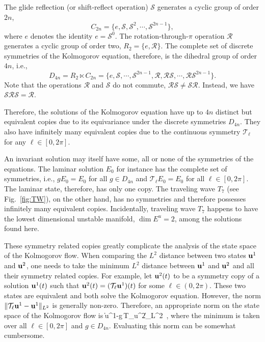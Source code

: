 \documentclass{jfm}
\begin{document}
The glide reflection (or shift-reflect operation) $\mathcal S$ generates a cyclic group of order $2n$,
$$C_{2n}=\{e,\mathcal S,\mathcal S^2,\cdots,\mathcal S^{2n-1}\},$$
where $e$ denotes the
identity $e=\mathcal S^0$.
The rotation-through-$\pi$ operation $\mathcal R$ generates
a cyclic group of order two, $R_2=\{e,\mathcal R\}$. The complete set of discrete symmetries
of the Kolmogorov equation, therefore, is the dihedral group of order $4n$, i.e.,
$$D_{4n}=R_2\ltimes C_{2n}=\{e,\mathcal S,\cdots, \mathcal S^{2n-1},
\mathcal R,\mathcal R\mathcal S,\cdots,\mathcal R\mathcal S^{2n-1} \}.$$
Note that the operations $\mathcal R$ and $\mathcal S$ do not commute,
$\mathcal R\mathcal S\neq \mathcal S\mathcal R$. Instead, we have
$\mathcal S\mathcal R\mathcal S=\mathcal R$.

Therefore, the solutions of the Kolmogorov equation have up to $4n$ distinct but
equivalent copies due to its equivariance under the discrete symmetries $D_{4n}$.
They also have infinitely many equivalent copies due to the continuous symmetry
$\mathcal T_\ell$ for any $\ell\in[0,2\pi]$.

An invariant solution may itself have some, all or none of the symmetries of the equations.
The laminar solution $E_0$ for instance has the complete set of symmetries, i.e., $gE_0=E_0$ for
all $g\in D_{4n}$ and $\mathcal T_\ell E_0=E_0$ for all $\ell\in[0,2\pi]$. The
laminar state, therefore, has only one copy.
The traveling wave $T_7$ (see Fig.~\ref{fig:TW}), on the other hand, has no symmetries and therefore
possesses infinitely many equivalent copies. Incidentally, traveling wave $T_7$ happens to have the
lowest dimensional unstable manifold, $\dim E^u=2$, among the solutions found here.

These symmetry related copies greatly complicate the analysis of the state space of the Kolmogorov
flow. When comparing the $L^2$ distance between two states $\mathbf u^1$ and $\mathbf u^2$,
one needs to take the minimum $L^2$ distance between $\mathbf u^1$ and $\mathbf u^2$ and all their symmetry
related copies. For example, let $\mathbf u^2(t)$ to be a symmetry copy of
a solution $\mathbf u^1(t)$ such that
$\mathbf u^2(t)=(\mathcal T_\ell\mathbf u^1)(t)$ for some $\ell\in(0,2\pi)$. These two
states are equivalent and
both solve the Kolmogorov equation. However, the norm $\|\mathcal T_\ell\mathbf u^1-\mathbf u^1\|_{L^2}$ is
generally non-zero. Therefore, an appropriate norm on the state space of the
Kolmogorov flow is
\beq
\min
\|\vc u^1-g\,\mathcal T_{\ell}\vc u^2\|_{L^2}
\,,
\eeq
where the minimum is taken over all $\ell\in[0,2\pi]$ and $g\in D_{4n}$.
Evaluating this norm can be somewhat cumbersome.
\end{document}
